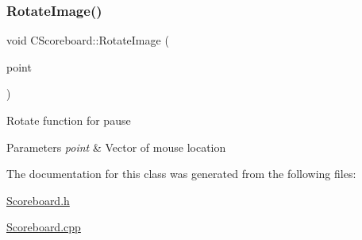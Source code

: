 \subsubsection{\texorpdfstring{RotateImage()}{RotateImage()}}
{\footnotesize\ttfamily void C\+Scoreboard\+::\+Rotate\+Image (\begin{DoxyParamCaption}\item[{C\+Point}]{point }\end{DoxyParamCaption})\hspace{0.3cm}{\ttfamily [inline]}}

Rotate function for pause 
\begin{DoxyParams}{Parameters}
{\em point} & Vector of mouse location \\
\hline
\end{DoxyParams}


The documentation for this class was generated from the following files\+:\begin{DoxyCompactItemize}
\item 
\mbox{\hyperlink{_scoreboard_8h}{Scoreboard.\+h}}\item 
\mbox{\hyperlink{_scoreboard_8cpp}{Scoreboard.\+cpp}}\end{DoxyCompactItemize}
